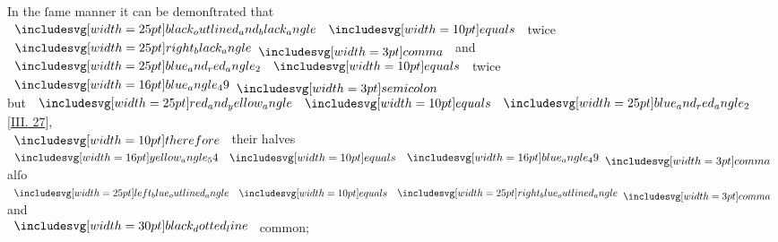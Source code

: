 \documentclass[12pt,preview]{standalone}
\begin{document}
\begin{minipage}[t]{0.64\textwidth}
    \hfill

    \begin{center}
        In the ſame manner it can be demonſtrated that\\
        $\img{black_outlined_and_black_angle} \bequals$ twice $\img{right_black_angle} \bcomma$ and $\img{blue_and_red_angle_2} \bequals$ twice $\img[0][0][16]{blue_angle_49} \bsemicolon$\\
        but $\img{red_and_yellow_angle} \bequals \img{blue_and_red_angle_2}$ [\hyperref[book3pr27]{\textsc{III.} 27}],\\
        $\btherefore$ their halves $\img[0][0][16]{yellow_angle_54} \bequals \img[0][0][16]{blue_angle_49} \bcomma$ alſo $\img{left_blue_outlined_angle} \bequals \img{right_blue_outlined_angle} \bcomma$ and\\
        $\dottedblackline$ common;
    \end{center}
\end{minipage}%
\hfill
\begin{minipage}[t]{0.33\textwidth}
    \vspace{40pt}
    
\end{minipage}%

\hfill

\hfill

\pagebreak
\end{document}

